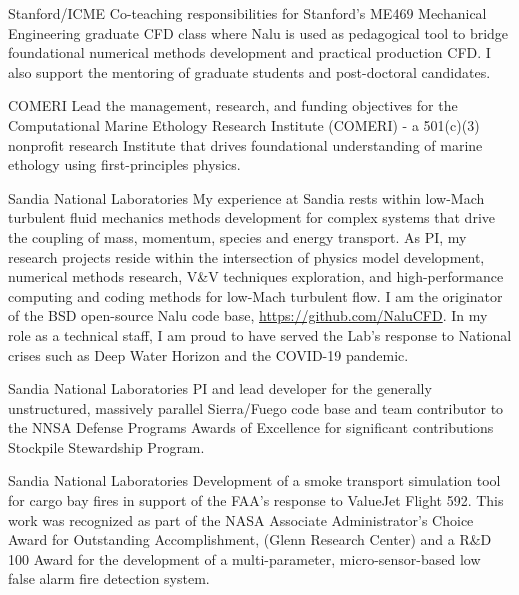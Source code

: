 \documentclass[letterpaper]{twentysecondcv_spd} %
\begin{document}
\begin{twenty} %
     
    {Stanford/ICME} {Co-teaching responsibilities for Stanford's ME469 Mechanical Engineering graduate CFD 
   class where Nalu is used as pedagogical tool to bridge foundational numerical methods development and practical production CFD. I also support the 
   mentoring of graduate students and post-doctoral candidates.}

    {COMERI} {Lead the management, research, and funding objectives
    for the Computational Marine Ethology Research Institute (COMERI) - a 501(c)(3) nonprofit research Institute that drives 
    foundational understanding of marine ethology using first-principles physics.}
    
      {Sandia National Laboratories} {My experience at Sandia rests within low-Mach 
    turbulent fluid mechanics methods development for complex systems that drive the coupling of mass, momentum, species and energy transport. 
    As PI, my research projects reside within the intersection of physics model development, numerical methods research, V\&V techniques exploration, and 
    high-performance computing and coding methods for low-Mach turbulent flow. I am the originator of the BSD open-source Nalu
    code base, \underline{https://github.com/NaluCFD}. In my role as a technical staff, I am proud to have served the Lab's response to National crises 
    such as Deep Water Horizon and the COVID-19 pandemic.}
    
   {Sandia National Laboratories}  {PI
    and lead developer for the generally unstructured, massively parallel Sierra/Fuego code base and team contributor to the NNSA Defense Programs Awards of Excellence for 
    significant contributions Stockpile Stewardship Program.}
    
   {Sandia National Laboratories}  {Development of a smoke transport simulation tool for cargo bay 
  fires in support of the FAA's response to ValueJet Flight 592. This work was recognized as part of the NASA Associate Administrator's Choice Award for Outstanding Accomplishment, (Glenn Research Center) 
  and a R\&D 100 Award for the development of a multi-parameter, micro-sensor-based low false alarm fire detection system.}
  
\end{twenty}
\end{document}
